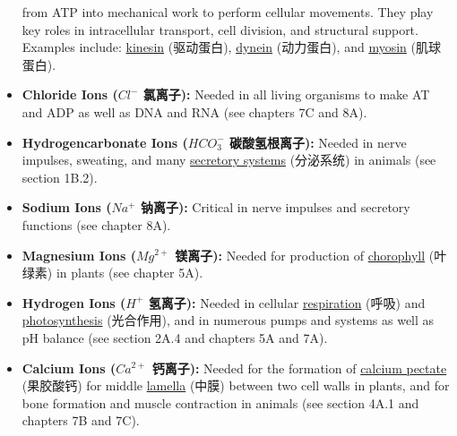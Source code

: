 \begin{itemize}
{    from ATP into mechanical work to perform cellular movements. They play key roles in intracellular transport, cell division,
    and structural support. Examples include: \underline{kinesin} (驱动蛋白), \underline{dynein} (动力蛋白), and \underline{myosin}
    (肌球蛋白).}
    \item\textbf{Chloride Ions ($Cl^-$ 氯离子):} Needed in all living organisms to make AT and ADP as well as DNA and RNA (see
    chapters 7C and 8A).
    \item \textbf{Hydrogencarbonate Ions ($HCO_3^-$ 碳酸氢根离子):} Needed in nerve impulses, sweating, and many
    \underline{secretory systems} (分泌系统) in animals (see section 1B.2).
    \item \textbf{Sodium Ions ($Na^+$ 钠离子):} Critical in nerve impulses and secretory functions (see chapter 8A).
    \item \textbf{Magnesium Ions ($Mg^{2+}$ 镁离子):} Needed for production of \underline{chorophyll} (叶绿素) in plants (see
    chapter 5A).
    \item \textbf{Hydrogen Ions ($H^+$ 氢离子):} Needed in cellular \underline{respiration} (呼吸) and \underline{photosynthesis}
    (光合作用), and in numerous pumps and systems as well as pH balance (see section 2A.4 and chapters 5A and 7A).
    \item \textbf{Calcium Ions ($Ca^{2+}$ 钙离子):} Needed for the formation of \underline{calcium pectate} (果胶酸钙) for middle
    \underline{lamella} (中膜) between two cell walls in plants, and for bone formation and muscle contraction in animals (see
    section 4A.1 and chapters 7B and 7C).
\end{itemize}
